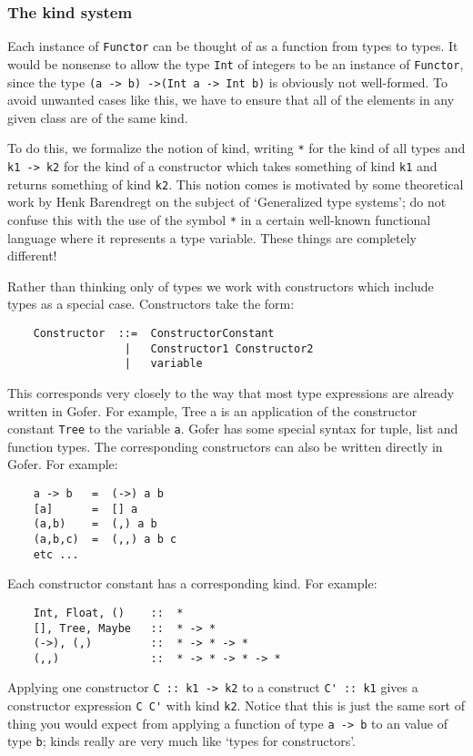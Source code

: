 \subsubsection{The kind system}
Each instance of \verb"Functor" can be thought of as a function from types to
types.  It would be nonsense to allow the type \verb"Int" of integers to be an
instance of \verb"Functor", since the type \verb"(a -> b) ->(Int a -> Int b)" is
obviously not well-formed.  To avoid unwanted cases like this, we have
to ensure that all of the elements in any given class are of the same
kind.

To do this, we formalize the notion of kind, writing \verb"*" for the kind of
all types and \verb"k1 -> k2" for the kind of a constructor which takes
something of kind \verb"k1" and returns something of kind \verb"k2".  This notion
comes is motivated by some theoretical work by Henk Barendregt on the
subject of `Generalized type systems'; do not confuse this with the use
of the symbol \verb"*" in a certain well-known functional language where it
represents a type variable.  These things are completely different!

Rather than thinking only of types we work with constructors which
include types as a special case.  Constructors take the form:
\begin{verbatim}
    Constructor  ::=  ConstructorConstant
                  |   Constructor1 Constructor2
                  |   variable
\end{verbatim}
This corresponds very closely to the way that most type expressions
are already written in Gofer.  For example, Tree a is an application
of the constructor constant \verb"Tree" to the variable \verb"a".  Gofer has some
special syntax for tuple, list and function types.  The corresponding
constructors can also be written directly in Gofer.  For example:
\begin{verbatim}
    a -> b   =  (->) a b
    [a]      =  [] a
    (a,b)    =  (,) a b
    (a,b,c)  =  (,,) a b c
    etc ...
\end{verbatim}
Each constructor constant has a corresponding kind.  For example:
\begin{verbatim}
    Int, Float, ()    ::  *
    [], Tree, Maybe   ::  * -> *
    (->), (,)         ::  * -> * -> *
    (,,)              ::  * -> * -> * -> *
\end{verbatim}
Applying one constructor \verb"C :: k1 -> k2" to a construct \verb"C' :: k1" gives
a constructor expression \verb"C C'" with kind \verb"k2".  Notice that this is just
the same sort of thing you would expect from applying a function of
type \verb"a -> b" to an value of type \verb"b"; kinds really are very much like
`types for constructors'.

